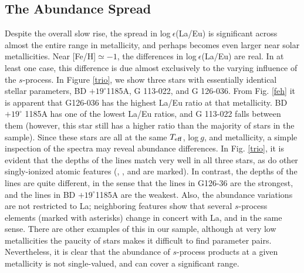 \documentclass[12pt,preprint]{aastex}
\def\teff{\mbox{$T_{\rm {eff}}$}}
\begin{document}
{\subsection{The Abundance Spread\label{trend}}
Despite the overall slow rise, the  spread in log$~\epsilon$(La/Eu) is significant across almost the  entire range in metallicity, and  perhaps becomes even larger near solar metallicities.   Near [Fe/H]$\simeq-1$, the differences in log$~\epsilon$(La/Eu) are real.  In at least one case, this difference is due almost exclusively to the varying influence of the $s$-process.  In Figure \ref{trio}, we show three stars with essentially identical stellar parameters, BD $+19^{\circ} $1185A, G 113-022, and G 126-036.  From Fig. \ref{feh} it is apparent that G126-036  has the highest La/Eu ratio at that metallicity. BD$ +19^{\circ}$ 1185A has one of the  lowest La/Eu ratios, and G 113-022 falls between them (however, this star still has a higher ratio than the majority of stars in the sample).  Since these stars are all at the same \teff, log$~g$, and metallicity, a simple inspection of the spectra may reveal abundance differences.  In Fig. \ref{trio},  it is evident that the depths of the  lines match very well in all three stars, as do other singly-ionized atomic features (, , and  are marked).   In contrast, the depths of the  lines are quite different, in the  sense that the lines in G126-36 are the strongest, and the lines in BD $+19^{\circ} $1185A are the weakest.  Also, the abundance variations are not restricted to La; neighboring features show that several $s$-process elements  (marked with asterisks)  change in concert with La, and in the same sense.  There  are other examples of this in our sample, although at very low metallicities the  paucity of stars makes it difficult to find parameter pairs.  Nevertheless, it is clear that the  abundance of $s$-process products at a given metallicity is not single-valued, and can cover a significant range. 

}
\end{document}
